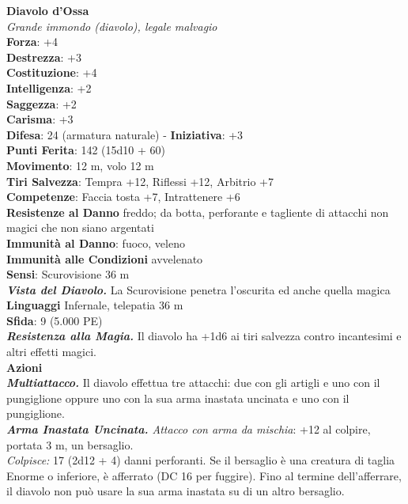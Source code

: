 \begin{multicols}{2}
\medskip\textbf{Diavolo d'Ossa}\\
\emph{Grande immondo (diavolo), legale malvagio}\\
\textbf{Forza}: +4\\
\textbf{Destrezza}: +3\\
\textbf{Costituzione}: +4\\
\textbf{Intelligenza}: +2\\
\textbf{Saggezza}: +2\\
\textbf{Carisma}: +3\\
\textbf{Difesa}: 24 (armatura naturale) - \textbf{Iniziativa}: +3\\
\textbf{Punti Ferita}: 142 (15d10 + 60)\\
\textbf{Movimento}: 12 m, volo 12 m\\
\textbf{Tiri Salvezza}: Tempra +12, Riflessi +12, Arbitrio +7\\
\textbf{Competenze}: Faccia tosta +7, Intrattenere +6\\
\textbf{Resistenze al Danno} freddo; da botta, perforante e tagliente di attacchi non magici che non siano argentati\\
\textbf{Immunità al Danno}: fuoco, veleno\\
\textbf{Immunità alle Condizioni} avvelenato\\
\textbf{Sensi}: Scurovisione 36 m\\
\emph{\textbf{Vista del Diavolo.}} La Scurovisione penetra l'oscurita ed anche quella magica\\
\textbf{Linguaggi} Infernale, telepatia 36 m \\
\textbf{Sfida}: 9 (5.000 PE)\smallskip\\
\emph{\textbf{Resistenza alla Magia.}} Il diavolo ha +1d6 ai tiri salvezza contro incantesimi e altri effetti magici.\\
\smallskip\textbf{Azioni}\\
\emph{\textbf{Multiattacco.}} Il diavolo effettua tre attacchi: due con gli artigli e uno con il pungiglione oppure uno con la sua arma inastata uncinata e uno con il pungiglione.\\
\emph{\textbf{Arma Inastata Uncinata.} Attacco con arma da mischia}: +12 al colpire, portata 3 m, un bersaglio.\\
\emph{Colpisce:} 17 (2d12 + 4) danni perforanti. Se il bersaglio è una creatura di taglia Enorme o inferiore, è afferrato (DC  16 per fuggire). Fino al termine dell'afferrare, il diavolo non può usare la sua arma inastata su di un altro bersaglio.\\

\end{multicols}
